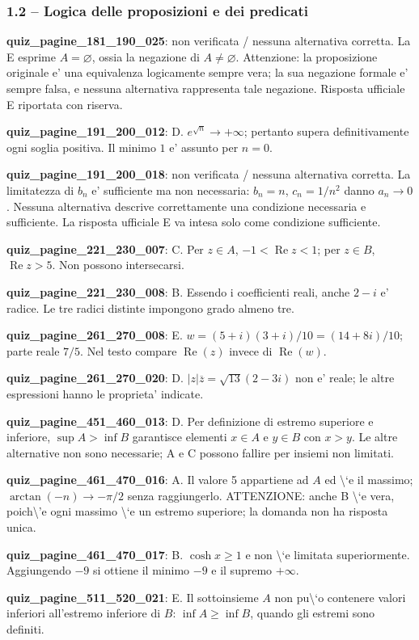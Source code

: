 \documentclass[11pt,a4paper]{article}
\newcounter{quiz}
\begin{document}
\subsubsection*{1.2 -- Logica delle proposizioni e dei predicati}
\noindent\textbf{quiz\_pagine\_181\_190\_025}: non verificata / nessuna alternativa corretta. La E esprime $A=\varnothing$, ossia la negazione di $A\neq\varnothing$. Attenzione: la proposizione originale e' una equivalenza logicamente sempre vera; la sua negazione formale e' sempre falsa, e nessuna alternativa rappresenta tale negazione. Risposta ufficiale E riportata con riserva.\par\medskip
\noindent\textbf{quiz\_pagine\_191\_200\_012}: D. $e^{\sqrt n}\to+\infty$; pertanto supera definitivamente ogni soglia positiva. Il minimo $1$ e' assunto per $n=0$.\par\medskip
\noindent\textbf{quiz\_pagine\_191\_200\_018}: non verificata / nessuna alternativa corretta. La limitatezza di $b_n$ e' sufficiente ma non necessaria: $b_n=n$, $c_n=1/n^2$ danno $a_n\to0$. Nessuna alternativa descrive correttamente una condizione necessaria e sufficiente. La risposta ufficiale E va intesa solo come condizione sufficiente.\par\medskip
\noindent\textbf{quiz\_pagine\_221\_230\_007}: C. Per $z\in A$, $-1<\operatorname{Re}z<1$; per $z\in B$, $\operatorname{Re}z>5$. Non possono intersecarsi.\par\medskip
\noindent\textbf{quiz\_pagine\_221\_230\_008}: B. Essendo i coefficienti reali, anche $2-i$ e' radice. Le tre radici distinte impongono grado almeno tre.\par\medskip
\noindent\textbf{quiz\_pagine\_261\_270\_008}: E. $w=(5+i)(3+i)/10=(14+8i)/10$; parte reale $7/5$. Nel testo compare $\operatorname{Re}(z)$ invece di $\operatorname{Re}(w)$.\par\medskip
\noindent\textbf{quiz\_pagine\_261\_270\_020}: D. $|z|\overline z=\sqrt{13}(2-3i)$ non e' reale; le altre espressioni hanno le proprieta' indicate.\par\medskip
\noindent\textbf{quiz\_pagine\_451\_460\_013}: D. Per definizione di estremo superiore e inferiore, $\sup A>\inf B$ garantisce elementi $x\in A$ e $y\in B$ con $x>y$. Le altre alternative non sono necessarie; A e C possono fallire per insiemi non limitati.\par\medskip
\noindent\textbf{quiz\_pagine\_461\_470\_016}: A. Il valore 5 appartiene ad $A$ ed \textbackslash{}`e il massimo; $\arctan(-n)\to-\pi/2$ senza raggiungerlo. ATTENZIONE: anche B \textbackslash{}`e vera, poich\textbackslash{}'e ogni massimo \textbackslash{}`e un estremo superiore; la domanda non ha risposta unica.\par\medskip
\noindent\textbf{quiz\_pagine\_461\_470\_017}: B. $\cosh x\ge1$ e non \textbackslash{}`e limitata superiormente. Aggiungendo $-9$ si ottiene il minimo $-9$ e il supremo $+\infty$.\par\medskip
\noindent\textbf{quiz\_pagine\_511\_520\_021}: E. Il sottoinsieme $A$ non pu\textbackslash{}`o contenere valori inferiori all'estremo inferiore di $B$: $\inf A\ge\inf B$, quando gli estremi sono definiti.\par\medskip
\end{document}
